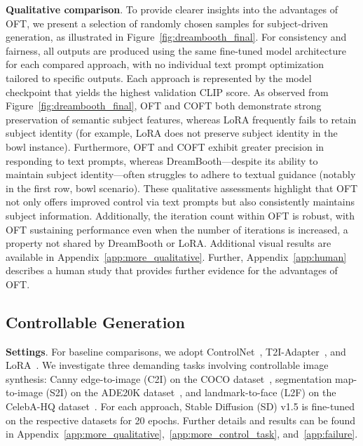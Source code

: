 {\textbf{Qualitative comparison}. To provide clearer insights into the advantages of OFT, we present a selection of randomly chosen samples for subject-driven generation, as illustrated in Figure~\ref{fig:dreambooth_final}. For consistency and fairness, all outputs are produced using the same fine-tuned model architecture for each compared approach, with no individual text prompt optimization tailored to specific outputs. Each approach is represented by the model checkpoint that yields the highest validation CLIP score. As observed from Figure~\ref{fig:dreambooth_final}, OFT and COFT both demonstrate strong preservation of semantic subject features, whereas LoRA frequently fails to retain subject identity (for example, LoRA does not preserve subject identity in the bowl instance). Furthermore, OFT and COFT exhibit greater precision in responding to text prompts, whereas DreamBooth—despite its ability to maintain subject identity—often struggles to adhere to textual guidance (notably in the first row, bowl scenario). These qualitative assessments highlight that OFT not only offers improved control via text prompts but also consistently maintains subject information. Additionally, the iteration count within OFT is robust, with OFT sustaining performance even when the number of iterations is increased, a property not shared by DreamBooth or LoRA. Additional visual results are available in Appendix~\ref{app:more_qualitative}. Further, Appendix~\ref{app:human} describes a human study that provides further evidence for the advantages of OFT.

\subsection{Controllable Generation}

\textbf{Settings}. For baseline comparisons, we adopt ControlNet~\cite{zhang2023adding}, T2I-Adapter~\cite{mou2023t2i}, and LoRA~\cite{hulora2022}. We investigate three demanding tasks involving controllable image synthesis: Canny edge-to-image (C2I) on the COCO dataset~\cite{lin2014microsoft}, segmentation map-to-image (S2I) on the ADE20K dataset~\cite{zhou2017scene}, and landmark-to-face (L2F) on the CelebA-HQ dataset~\cite{karras2018progressive,xia2021tedigan}. For each approach, Stable Diffusion (SD) v1.5 is fine-tuned on the respective datasets for 20 epochs. Further details and results can be found in Appendix~\ref{app:more_qualitative},~\ref{app:more_control_task}, and~\ref{app:failure}.

}
